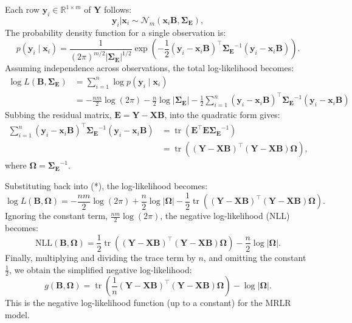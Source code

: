 \documentclass[11pt]{report} %
\begin{document}
Each row \( \mathbf{y}_i \in \mathbb{R}^{1 \times m} \) of \( \mathbf{Y} \) follows:
\[
\mathbf{y}_i|\mathbf{x}_i \sim \mathcal{N}_m(\mathbf{x}_i \mathbf{B}, \mathbf{\Sigma_E}),
\]
The probability density function for a single observation is:
\[
p(\mathbf{y}_i \mid \mathbf{x}_i) = \frac{1}{(2\pi)^{m/2} |\mathbf{\Sigma_E}|^{1/2}} \exp\left( -\frac{1}{2} (\mathbf{y}_i - \mathbf{x}_i \mathbf{B})^\top \mathbf{\Sigma_E}^{-1} (\mathbf{y}_i - \mathbf{x}_i \mathbf{B}) \right).
\]
Assuming independence across observations, the total log-likelihood becomes:
\begin{align*}
\log L(\mathbf{B}, \mathbf{\Sigma_E}) &= \sum_{i=1}^n \log p(\mathbf{y}_i \mid \mathbf{x}_i) \\
&= -\frac{nm}{2} \log(2\pi) - \frac{n}{2} \log |\mathbf{\Sigma_E}| - \frac{1}{2} \sum_{i=1}^n (\mathbf{y}_i - \mathbf{x}_i \mathbf{B})^\top \mathbf{\Sigma_E}^{-1} (\mathbf{y}_i - \mathbf{x}_i \mathbf{B})
\tag{*}
\end{align*}
Subbing the residual matrix, $\mathbf{E} = \mathbf{Y} - \mathbf{X} \mathbf{B}$, into the quadratic form gives:
\begin{align*}
\sum_{i=1}^n (\mathbf{y}_i - \mathbf{x}_i \mathbf{B})^\top \mathbf{\Sigma_E}^{-1} (\mathbf{y}_i - \mathbf{x}_i \mathbf{B}) &= \operatorname{tr} \left( \mathbf{E}^\top \mathbf{E} \mathbf{\Sigma_E}^{-1} \right)\\
&= \operatorname{tr} \left( (\mathbf{Y} - \mathbf{X} \mathbf{B})^\top (\mathbf{Y} - \mathbf{X} \mathbf{B}) \mathbf{\Omega} \right),
\end{align*}
where $\mathbf{\Omega} = \mathbf{\Sigma_E}^{-1}$.

Substituting back into (*), the log-likelihood becomes:
\[
\log L(\mathbf{B}, \mathbf{\Omega}) = -\frac{nm}{2} \log(2\pi) + \frac{n}{2} \log |\mathbf{\Omega}| - \frac{1}{2} \operatorname{tr} \left( (\mathbf{Y} - \mathbf{X} \mathbf{B})^\top (\mathbf{Y} - \mathbf{X} \mathbf{B}) \mathbf{\Omega} \right).
\]
Ignoring the constant term, \( \frac{nm}{2} \log(2\pi) \), the negative log-likelihood (NLL) becomes:
\[
\text{NLL}(\mathbf{B}, \mathbf{\Omega}) = \frac{1}{2} \operatorname{tr} \left( (\mathbf{Y} - \mathbf{X} \mathbf{B})^\top (\mathbf{Y} - \mathbf{X} \mathbf{B}) \mathbf{\Omega} \right) - \frac{n}{2} \log |\mathbf{\Omega}|.
\]
Finally, multiplying and dividing the trace term by \( n \), and omitting the constant \( \frac{1}{2} \), we obtain the simplified negative log-likelihood:
\[
g(\mathbf{B}, \mathbf{\Omega}) = \operatorname{tr} \left( \frac{1}{n} (\mathbf{Y} - \mathbf{X} \mathbf{B})^\top (\mathbf{Y} - \mathbf{X} \mathbf{B}) \mathbf{\Omega} \right) - \log |\mathbf{\Omega}|.
\]
This is the negative log-likelihood function (up to a constant) for the MRLR model.
\end{document}
